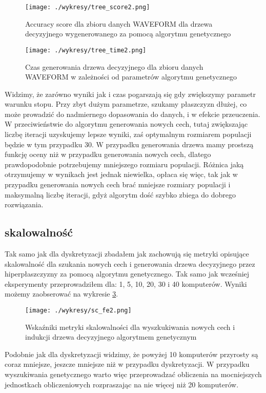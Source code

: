 \documentclass[magisterska]{pracamgr}
\theoremstyle{plain}
\theoremstyle{definition}
\theoremstyle{remark}
\begin{document}
  
\begin{figure}\label{fig:tree_score}
 \caption{Accuracy score dla zbioru danych WAVEFORM dla drzewa decyzyjnego wygenerowanego za pomocą algorytmu genetycznego}
 \centering\texttt{[image: ./wykresy/tree\_score2.png]}
\end{figure}

\begin{figure}\label{fig:tree_time}
 \caption{Czas generowania drzewa decyzyjnego dla zbioru danych WAVEFORM w zależności od parametrów algorytmu genetycznego}
 \centering\texttt{[image: ./wykresy/tree\_time2.png]}
\end{figure}

Widzimy, że zarówno wyniki jak i czas pogarszają się gdy zwiększymy parametr warunku stopu. Przy zbyt dużym parametrze, 
szukamy płaszczyzn dłużej, co może prowadzić do nadmiernego dopasowania do danych, i w efekcie przeuczenia.
W przeciwieństwie do algorytmu generowania nowych cech, tutaj zwiększając liczbę iteracji uzyskujemy lepsze wyniki,
zaś optymalnym rozmiarem populacji będzie w tym przypadku 30. W przypadku generowania drzewa mamy prostszą funkcję
oceny niż w przypadku generowania nowych cech, dlatego prawdopodobnie potrzebujemy mniejszego rozmiaru populacji.
Różnica jaką otrzymujemy w wynikach jest jednak niewielka, opłaca się więc, tak jak w przypadku generowania nowych cech
brać mniejsze rozmiary populacji i maksymalną liczbę iteracji, gdyż algorytm dość szybko zbiega do dobrego rozwiązania.

\subsection{skalowalność}
Tak samo jak dla dyskretyzacji zbadałem jak zachowują się metryki opisujące skalowalność dla szukania nowych cech i generowania
drzewa decyzyjnego przez hiperpłaszczyzny za pomocą algorytmu genetycznego. Tak samo jak wcześniej eksperymenty
przeprowadziłem dla: 1, 5, 10, 20, 30 i 40 komputerów. Wyniki możemy zaobserować na wykresie \ref{fig:sc_fe}.

\begin{figure}\label{fig:sc_fe}
 \caption{Wskaźniki metryki skalowalności dla wyszkukiwania nowych cech i indukcji drzewa decyzyjnego algorytmem genetycznym}
 \centering\texttt{[image: ./wykresy/sc\_fe2.png]}
\end{figure}

Podobnie jak dla dyskretyzacji widzimy, że powyżej 10 komputerów przyrosty są coraz mniejsze, jeszcze mniejsze niż w przypadku
dyskretyzacji. W przypadku wyszukiwania genetycznego warto więc przeprowadzać obliczenia na mocniejszych jednostkach obliczeniowych
rozpraszając na nie więcej niż 20 komputerów.
\newpage
\end{document}
